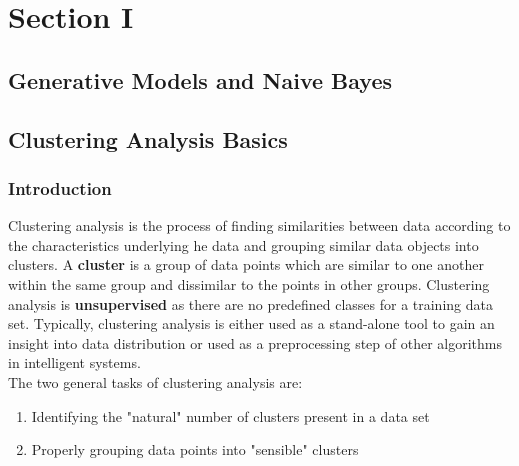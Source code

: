\documentclass[11pt,fleqn]{book} %
\begin{document}

\part{Section I}



\chapter{Generative Models and Naive Bayes}



\chapter{Clustering Analysis Basics}

\section{Introduction}
Clustering analysis is the process of finding similarities between data according to the characteristics underlying he data and grouping similar data objects into clusters. A \textbf{cluster} is a group of data points which are similar to one another within the same group and dissimilar to the points in other groups. Clustering analysis is \textbf{unsupervised} as there are no predefined classes for a training data set. Typically, clustering analysis is either used as a stand-alone tool to gain an insight into data distribution or used as a preprocessing step of other algorithms in intelligent systems.\\

\noindent
The two general tasks of clustering analysis are:
\begin{enumerate}
	\item Identifying the "natural" number of clusters present in a data set
	\item Properly grouping data points into "sensible" clusters
\end{enumerate}
\end{document}
